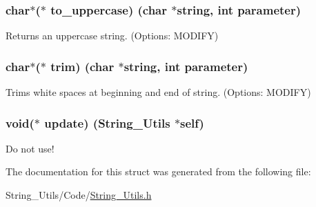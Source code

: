 \subsubsection[{to\+\_\+uppercase}]{\setlength{\rightskip}{0pt plus 5cm}char$\ast$($\ast$ to\+\_\+uppercase) (char $\ast$string, int parameter)}\label{struct_string___utils_ad0509a3af747c289031c30a2090b51e4}


Returns an uppercase string. (Options\+: M\+O\+D\+I\+F\+Y) 

\hypertarget{struct_string___utils_a02777c13e79db30115643ae7d63ee7a1}{}
\subsubsection[{trim}]{\setlength{\rightskip}{0pt plus 5cm}char$\ast$($\ast$ trim) (char $\ast$string, int parameter)}\label{struct_string___utils_a02777c13e79db30115643ae7d63ee7a1}


Trims white spaces at beginning and end of string. (Options\+: M\+O\+D\+I\+F\+Y) 

\hypertarget{struct_string___utils_adb024a194f2233b94721c1d45940be23}{}
\subsubsection[{update}]{\setlength{\rightskip}{0pt plus 5cm}void($\ast$ update) ({\bf String\+\_\+\+Utils} $\ast$self)}\label{struct_string___utils_adb024a194f2233b94721c1d45940be23}


Do not use! 



The documentation for this struct was generated from the following file\+:\begin{DoxyCompactItemize}
\item 
String\+\_\+\+Utils/\+Code/\hyperlink{_string___utils_8h}{String\+\_\+\+Utils.\+h}\end{DoxyCompactItemize}
